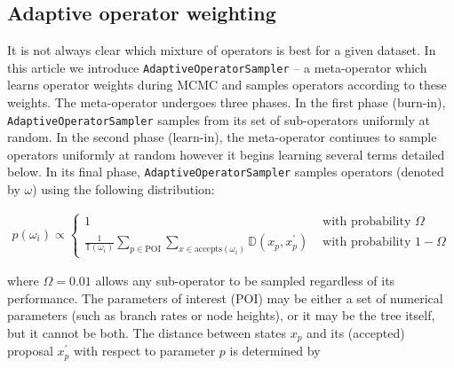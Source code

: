 \documentclass[10pt,letterpaper]{article}
\begin{document}
\clearpage
\subsection*{Adaptive operator weighting}
\label{sect:adaptiveSampling}













It is not always clear which mixture of operators is best for a given dataset.
In this article we introduce \texttt{AdaptiveOperatorSampler} -- a meta-operator which learns operator weights during MCMC and samples operators according to these weights.
The meta-operator undergoes three phases.
In the first phase (burn-in), \texttt{AdaptiveOperatorSampler} samples from its set of sub-operators uniformly at random.
In the second phase (learn-in), the meta-operator continues to sample operators uniformly at random however it begins learning several terms detailed below.
In its final phase, \texttt{AdaptiveOperatorSampler} samples operators (denoted by $\omega$) using the following distribution:


\begin{align}
\label{eqn:adaptiveSampler}
	p(\omega_i) \propto \begin{cases} 1 & \text{ with probability } \Omega \\ \frac{1}{\mathbb{T}(\omega_i)} \sum\limits_{p \in \text{POI}}  \sum\limits_{x \in \text{accepts}(\omega_i)}  \mathbb{D}(x_p, x_p^\prime) & \text{ with probability } 1-\Omega \end{cases}
\end{align}

where $\Omega = 0.01$ allows any sub-operator to be sampled regardless of its performance.
The parameters of interest (POI) may be either a set of numerical parameters (such as branch rates or node heights), or it may be the tree itself, but it cannot be both.
The distance between states $x_p$ and its (accepted) proposal $x_p^\prime$ with respect to parameter $p$ is determined by
\end{document}
